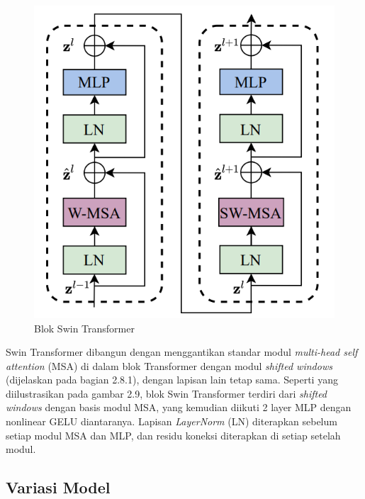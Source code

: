 \begin{figure}[ht]
  \centering
  \includegraphics[scale=0.5]{gambar/Blok Swin.png}
  \caption{Blok Swin Transformer}
  \label{fig:blokswintransformer}
\end{figure}

Swin Transformer dibangun dengan menggantikan standar modul \emph{multi-head self attention} (MSA) di dalam blok Transformer dengan modul \emph{shifted windows} (dijelaskan pada bagian 2.8.1), dengan 
lapisan lain tetap sama. Seperti yang diilustrasikan pada gambar 2.9, blok Swin Transformer terdiri dari \emph{shifted windows} dengan basis modul MSA, yang kemudian diikuti 2 layer MLP dengan 
nonlinear GELU diantaranya. Lapisan \emph{LayerNorm} (LN) diterapkan sebelum setiap modul MSA dan MLP, dan residu koneksi diterapkan di setiap setelah modul. \parencite{Liu2021}

\subsection{Variasi Model}

